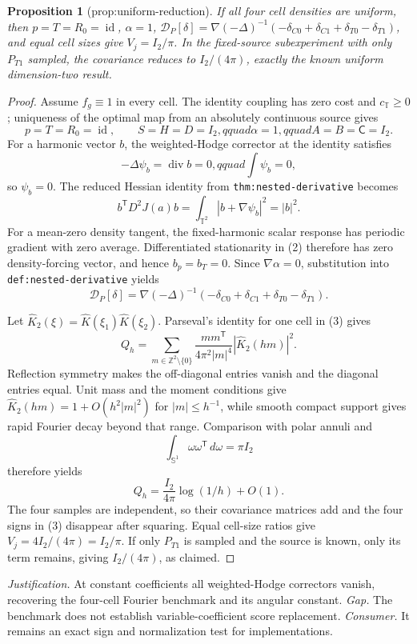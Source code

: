 \documentclass{article}
\newtheorem{proposition}{Proposition}
\begin{document}
\begin{proposition}[prop:uniform-reduction]\label{prop:uniform-reduction}
If all four cell densities are uniform, then \(p=T=R_0=\operatorname{id}\), \(\alpha=1\), \(\mathcal D_P[\delta]=\nabla(-\Delta)^{-1}(-\delta_{C0}+\delta_{C1}+\delta_{T0}-\delta_{T1})\), and equal cell sizes give \(V_j=I_2/\pi\). In the fixed-source subexperiment with only \(P_{T1}\) sampled, the covariance reduces to \(I_2/(4\pi)\), exactly the known uniform dimension-two result.
\end{proposition}
\begin{proof}
Assume \(f_g\equiv1\) in every cell.  The identity coupling has zero cost and \(c_{\mathbb T}\geq0\); uniqueness of the optimal map from an absolutely continuous source gives
\[
 p=T=R_0=\operatorname{id},\qquad
 S=H=D=I_2,qquad \alpha=1,qquad A=B=\mathsf C=I_2.                  \tag{1}
\]
For a harmonic vector \(b\), the weighted-Hodge corrector at the identity satisfies
\[
 -\Delta\psi_b=\operatorname{div}b=0,qquad \int\psi_b=0,
\]
so \(\psi_b=0\).  The reduced Hessian identity from \texttt{thm:nested-derivative} becomes
\[
 b^{\mathsf T}D^2J(a)b=\int_{\mathbb T^2}|b+\nabla\psi_b|^2=|b|^2.   \tag{2}
\]
For a mean-zero density tangent, the fixed-harmonic scalar response has periodic gradient with zero average.  Differentiated stationarity in (2) therefore has zero density-forcing vector, and hence \(b_p=b_T=0\).  Since \(\nabla\alpha=0\), substitution into \texttt{def:nested-derivative} yields
\[
 \mathcal D_P[\delta]
 =\nabla(-\Delta)^{-1}
 (-\delta_{C0}+\delta_{C1}+\delta_{T0}-\delta_{T1}).                  \tag{3}
\]

Let \(\widehat K_2(\xi)=\widehat K(\xi_1)\widehat K(\xi_2)\).  Parseval's identity for one cell in (3) gives
\[
 Q_h=\sum_{m\in\mathbb Z^2\setminus\{0\}}
 \frac{mm^{\mathsf T}}{4\pi^2|m|^4}|\widehat K_2(hm)|^2.             \tag{4}
\]
Reflection symmetry makes the off-diagonal entries vanish and the diagonal entries equal.  Unit mass and the moment conditions give
\(\widehat K_2(hm)=1+O(h^2|m|^2)\) for \(|m|\leq h^{-1}\), while smooth compact support gives rapid Fourier decay beyond that range.  Comparison with polar annuli and
\[
 \int_{\mathbb S^1}\omega\omega^{\mathsf T}\,d\omega=\pi I_2
\]
therefore yields
\[
 Q_h=\frac{I_2}{4\pi}\log(1/h)+O(1).                                 \tag{5}
\]
The four samples are independent, so their covariance matrices add and the four signs in (3) disappear after squaring.  Equal cell-size ratios give
\(V_j=4I_2/(4\pi)=I_2/\pi\).  If only \(P_{T1}\) is sampled and the source is known, only its term remains, giving \(I_2/(4\pi)\), as claimed.
\end{proof}
\par\smallskip\noindent \textit{Justification.} At constant coefficients all weighted-Hodge correctors vanish, recovering the four-cell Fourier benchmark and its angular constant. \textit{Gap.} The benchmark does not establish variable-coefficient score replacement. \textit{Consumer.} It remains an exact sign and normalization test for implementations.
\end{document}
